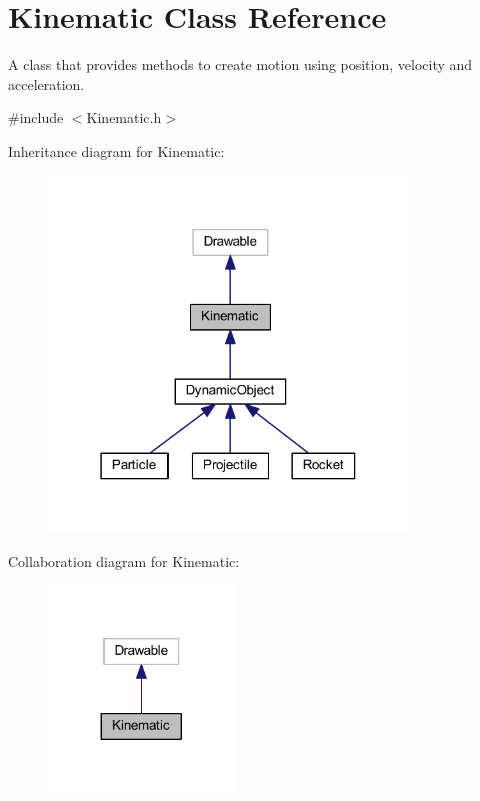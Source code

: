 \hypertarget{class_kinematic}{}\section{Kinematic Class Reference}
\label{class_kinematic}


A class that provides methods to create motion using position, velocity and acceleration.  




{\ttfamily \#include $<$Kinematic.\+h$>$}



Inheritance diagram for Kinematic\+:\nopagebreak
\begin{figure}[H]
\begin{center}
\leavevmode
\includegraphics[width=271pt]{class_kinematic__inherit__graph}
\end{center}
\end{figure}


Collaboration diagram for Kinematic\+:\nopagebreak
\begin{figure}[H]
\begin{center}
\leavevmode
\includegraphics[width=140pt]{class_kinematic__coll__graph}
\end{center}
\end{figure}
